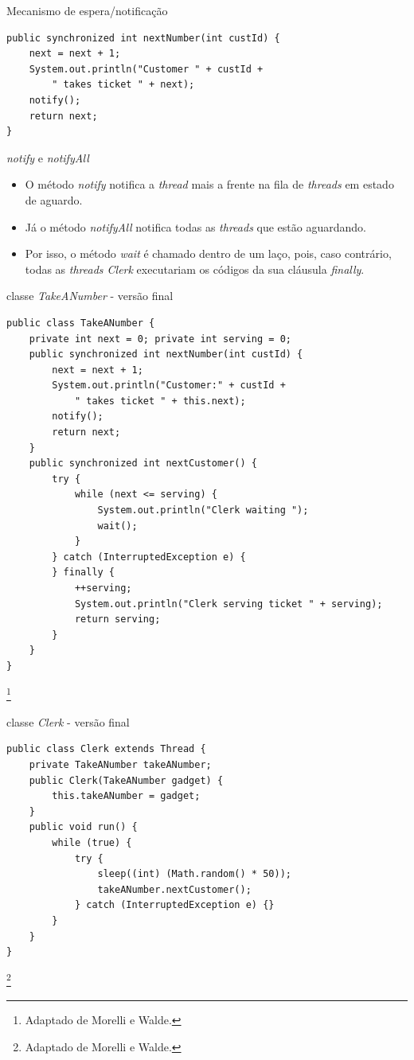 \documentclass[11pt,justified]{beamer}
\newcommand\blfootnote[1]{%
  \begingroup
  \renewcommand\thefootnote{}\footnote{#1}%
  \addtocounter{footnote}{-1}%
  \endgroup
}
\begin{document}
\begin{frame}[fragile]{Mecanismo de espera/notificação}
    \begin{lstlisting}
public synchronized int nextNumber(int custId) {
    next = next + 1;
    System.out.println("Customer " + custId + 
        " takes ticket " + next);
    notify();
    return next;
}
    \end{lstlisting}
\end{frame}

\begin{frame}{\textit{notify} e \textit{notifyAll}}
    \begin{itemize}
        \item O método \textit{notify} notifica a \textit{thread} mais a frente na fila de \textit{threads} em estado de aguardo.
        \item Já o método \textit{notifyAll} notifica todas as \textit{threads} que estão aguardando.
        \item Por isso, o método \textit{wait} é chamado dentro de um laço, pois, caso contrário, todas as \textit{threads Clerk} executariam os códigos da sua cláusula \textit{finally}.
    \end{itemize}
\end{frame}


\begin{frame}[fragile]{classe \textit{TakeANumber} - versão final}
    \begin{lstlisting}
public class TakeANumber {
    private int next = 0; private int serving = 0;
    public synchronized int nextNumber(int custId) {
        next = next + 1;
        System.out.println("Customer:" + custId + 
            " takes ticket " + this.next);
        notify();
        return next;
    } 
    public synchronized int nextCustomer() {
        try {
            while (next <= serving) {
                System.out.println("Clerk waiting ");
                wait();
            }
        } catch (InterruptedException e) {
        } finally {
            ++serving;
            System.out.println("Clerk serving ticket " + serving);
            return serving;
        }
    }
}
    \end{lstlisting}\blfootnote{Adaptado de Morelli e Walde.}
\end{frame}

\begin{frame}[fragile]{classe \textit{Clerk} - versão final}
    \begin{lstlisting}
public class Clerk extends Thread {
    private TakeANumber takeANumber;
    public Clerk(TakeANumber gadget) {
        this.takeANumber = gadget;
    }
    public void run() {
        while (true) {
            try {
                sleep((int) (Math.random() * 50));
                takeANumber.nextCustomer();
            } catch (InterruptedException e) {}
        }
    }   
}
    \end{lstlisting}\blfootnote{Adaptado de Morelli e Walde.}
\end{frame}
\end{document}
